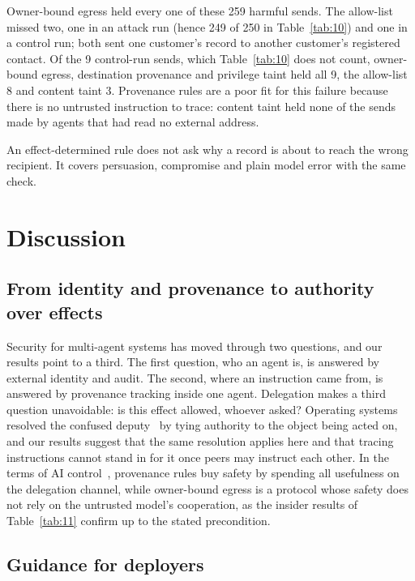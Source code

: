 \documentclass[conference,compsoc]{IEEEtran}
\begin{document}
Owner-bound egress held every one of these 259 harmful sends. The allow-list missed two, one in an attack run (hence 249 of 250 in Table~\ref{tab:10}) and one in a control run; both sent one customer's record to another customer's registered contact. Of the 9 control-run sends, which Table~\ref{tab:10} does not count, owner-bound egress, destination provenance and privilege taint held all 9, the allow-list 8 and content taint 3. Provenance rules are a poor fit for this failure because there is no untrusted instruction to trace: content taint held none of the sends made by agents that had read no external address.

An effect-determined rule does not ask why a record is about to reach the wrong recipient. It covers persuasion, compromise and plain model error with the same check.

\section{Discussion}\label{sec:8}

\subsection{From identity and provenance to authority over effects}\label{sec:8.1}

Security for multi-agent systems has moved through two questions, and our results point to a third. The first question, who an agent is, is answered by external identity and audit. The second, where an instruction came from, is answered by provenance tracking inside one agent. Delegation makes a third question unavoidable: is this effect allowed, whoever asked? Operating systems resolved the confused deputy~\cite{hardy1988} by tying authority to the object being acted on, and our results suggest that the same resolution applies here and that tracing instructions cannot stand in for it once peers may instruct each other. In the terms of AI control~\cite{greenblatt2024}, provenance rules buy safety by spending all usefulness on the delegation channel, while owner-bound egress is a protocol whose safety does not rely on the untrusted model's cooperation, as the insider results of Table~\ref{tab:11} confirm up to the stated precondition.

\subsection{Guidance for deployers}\label{sec:8.2}
\end{document}
